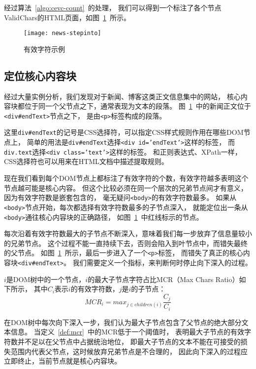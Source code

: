 经过算法~\ref{algo:cevc-count}~的处理，
我们可以得到一个标注了各个节点ValidChars的HTML页面，如图~\ref{fig:news-stepinto}~所示。

\begin{figure}[htbp]
\centering
\texttt{[image: news-stepinto]}
\caption{有效字符示例}
\label{fig:news-stepinto}
\end{figure}

\subsection{定位核心内容块}
经过大量实例分析，我们发现对于新闻、博客这类正文信息集中的网站，
核心内容块都位于同一个父节点之下，通常表现为文本的段落。
图~\ref{fig:news-stepinto}~中的新闻正文位于\texttt{<div\#endText>}节点之下，
是由\texttt{<p>}标签构成的段落。

这里\texttt{div\#endText}的记号是CSS选择符，可以指定CSS样式规则作用在哪些DOM节点上，
简单的用法是\texttt{div\#endText}选择\texttt{<div id='endText'>}这样的标签，
而\texttt{div.text}选择\texttt{<div class='text'>}这样的标签。
和正则表达式、XPath一样，CSS选择符也可以用来在HTML文档中描述提取规则。

现在我们看到每个DOM节点上都标注了有效字符的个数，有效字符越多表明这个节点越可能是核心内容。
但这个比较必须在同一个层次的兄弟节点间才有意义，因为有效字符数是嵌套包含的，
毫无疑问\texttt{<body>}的有效字符数最多。
如果从\texttt{<body>}节点开始，每次都选择有效字符数最多的子节点深入，
就能定位出一条从\texttt{<body>}通往核心内容块的正确路径，
如图~\ref{fig:news-stepinto}~中红线标示的节点。

每次沿着有效字符数最大的子节点不断深入，意味着我们每一步放弃了信息量较小的兄弟节点。
这个过程不能一直持续下去，否则会陷入到叶节点中，而错失最终的父节点。
如图~\ref{fig:news-stepinto}~所示，最后一步进入了一个\texttt{<p>}标签，
而错失了真正的核心内容块\texttt{<div\#endText>}。
我们需要定义一个指标，来判断何时停止向下深入的过程。

\begin{definition}
\label{def:mcr}
$i$是DOM树中的一个节点，$i$的最大子节点字符占比MCR（Max Chars Ratio）如下所示，
其中$C_i$表示$i$的有效字符数，$j$是$i$的子节点：
\begin{equation}
MCR_i = max_{j \in children(i)} \frac{C_j}{C_i}
\end{equation}
\end{definition}

在DOM树中每次向下深入一步，我们认为最大子节点包含了父节点的绝大部分文本信息。
当定义~\ref{def:mcr}~中的MCR低于一个阈值时，
表明最大子节点的有效字符数并不足以在父节点中占据统治地位，
即最大子节点的文本不能在可接受的损失范围内代表父节点，这时候放弃兄弟节点是不合理的，
因此向下深入的过程应立即终止，当前节点就是核心内容块。

